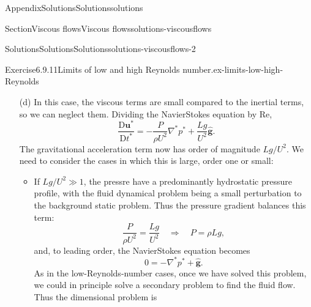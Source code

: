 \documentclass[oneside,10pt,]{book}
\newcommand{\ptxlistdisc}{\raisebox{0.3ex}{\textbullet}}
\numberwithin{equation}{section}
\newcommand{\DD}[2]{\frac{\mathrm{D}#1}{\mathrm{D}#2}}
\newcommand{\bu}{\boldsymbol{u}}
\newcommand{\bg}{\boldsymbol{g}}
\begin{document}
\begin{appendixptx}{Appendix}{Solutions}{}{Solutions}{}{}{solutions}
\begin{sectionptx}{Section}{Viscous flows}{}{Viscous flows}{}{}{solutions-viscousflows}
\begin{solutions-subsection-numberless}{Solutions}{Solutions}{}{Solutions}{}{}{solutions-viscousflows-2}
\begin{divisionsolution}{Exercise}{6.9.11}{Limits of low and high Reynolds number.}{ex-limits-low-high-Reynolds}
\begin{enumerate}[font=\bfseries,label=(\alph*),ref=\alph*]
\begin{itemize}[label=\ptxlistdisc]
\begin{equation*}
\nabla\cdot\bu=0.
\end{equation*}
%
\item{}If \(\rho L^2g/(\mu U)\ll1\), the gravitational acceleration term is small compared to the leading-order terms in the equation, and we set%
\begin{equation*}
\frac{LP}{\mu U}=1\quad\Rightarrow\quad P=\frac{\mu U}{L}.
\end{equation*}
We obtain the leading-order system%
\begin{equation*}
0=-\nabla^* p^*+\nabla^{*2}\bu^*,
\end{equation*}
and redimensionalising, we get%
\begin{equation*}
0=-\nabla p+\mu\nabla^2\bu,
\end{equation*}
and the continuity equation is retained in full:%
\begin{equation*}
\nabla\cdot\bu=0.
\end{equation*}
%
\end{itemize}
%
\item[(d)]\noindent\hypertarget{ex-limits-low-high-Reynolds-6-2-main}{}In this case, the viscous terms are small compared to the inertial terms, so we can neglect them. Dividing the Navier\textendash{}Stokes equation by \(\mathrm{Re}\),%
\begin{equation*}
\DD{\bu^*}{t^*}
=-\frac{P}{\rho U^2}\nabla^* p^*+\frac{Lg}{U^2}\hat{\bg}.
\end{equation*}
The gravitational acceleration term now has order of magnitude \(Lg/U^2\). We need to consider the cases in which this is large, order one or small:%
\begin{itemize}[label=\ptxlistdisc]
\item{}If \(Lg/U^2\gg1\), the pressre have a predominantly hydrostatic pressure profile, with the fluid dynamical problem being a small perturbation to the background static problem. Thus the pressure gradient balances this term:%
\begin{equation*}
\frac{P}{\rho U^2}=\frac{Lg}{U^2}
\quad\Rightarrow\quad
P=\rho Lg,
\end{equation*}
and, to leading order, the Navier\textendash{}Stokes equation becomes%
\begin{equation*}
0=-\nabla^* p^*+\hat{\bg}.
\end{equation*}
As in the low-Reynolds-number cases, once we have solved this problem, we could in principle solve a secondary problem to find the fluid flow. Thus the dimensional problem is%
\begin{equation*}

\end{equation*}
\end{itemize}
\end{enumerate}
\end{divisionsolution}
\end{solutions-subsection-numberless}
\end{sectionptx}
\end{appendixptx}
\end{document}
